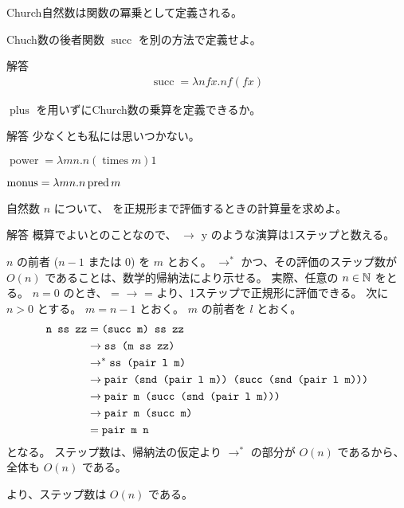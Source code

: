 Church自然数は関数の冪乗として定義される。

\begin{jexercise*}[5.2.2]
  Chuch数の後者関数 $\operatorname{succ}$ を別の方法で定義せよ。
\end{jexercise*}
\begin{itembox}[l]{解答}
  \begin{align*}
    \operatorname{succ} = \lambda n f x. n f (f x)
  \end{align*}
\end{itembox}

\begin{jexercise*}[5.2.3]
  $\operatorname{plus}$ を用いずにChurch数の乗算を定義できるか。
\end{jexercise*}
\begin{itembox}[l]{解答}
  少なくとも私には思いつかない。
\end{itembox}

\begin{jexercise*}[3.2.4]
  $\operatorname{power} = \lambda m n. n (\operatorname{times} m) 1$
\end{jexercise*}

\begin{jexercise*}[5.2.5]
  $\operatorname{monus} = \lambda m n. n \operatorname{pred} m$
\end{jexercise*}

\begin{jexercise*}[5.2.6]
  自然数 $n$ について、 を正規形まで評価するときの計算量を求めよ。
\end{jexercise*}
\begin{itembox}[l]{解答}
  概算でよいとのことなので、 $\to$ {y} のような演算は1ステップと数える。

  $n$ の前者 ($n - 1$ または $0$) を $m$ とおく。
   $\to^*$  かつ、その評価のステップ数が $O(n)$ であることは、数学的帰納法により示せる。
  実際、任意の $n \in \mathbb{N}$ をとる。
  $n = 0$ のとき、
    = 
    $\to$ 
    = 
  より、1ステップで正規形に評価できる。
  次に $n > 0$ とする。
  $m = n - 1$ とおく。
  $m$ の前者を $l$ とおく。
  \begin{align*}
    \texttt{n ss zz} & = \texttt{(succ m) ss zz}
    \\ & \to \texttt{ss (m ss zz)}
    \\ & \to^* \texttt{ss (pair l m)}
    \\ & \to \texttt{pair (snd (pair l m)) (succ (snd (pair l m)))}
    \\ & \to \texttt{pair m (succ (snd (pair l m)))}
    \\ & \to \texttt{pair m (succ m)}
    \\ & = \texttt{pair m n}
  \end{align*}
  となる。
  ステップ数は、帰納法の仮定より $\to^*$ の部分が $O(n)$ であるから、全体も $O(n)$ である。

   より、ステップ数は $O(n)$ である。
\end{itembox}

